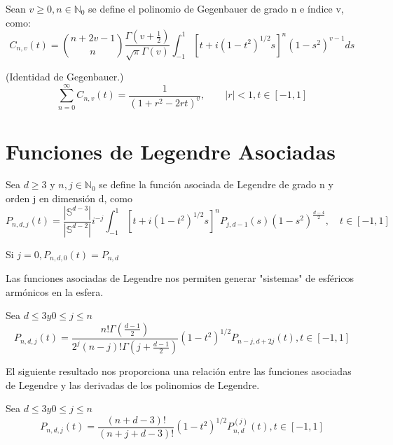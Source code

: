 \begin{defn}Sean $v\ge 0,n\in\mathds{N}_0$ se define el polinomio de Gegenbauer de grado n e índice v, como:
	$$C_{n,v}(t) = \binom{n+2v-1}{n}\frac{\Gamma(v+\frac{1}{2})}{\sqrt{\pi}\Gamma(v)}\int_{-1}^{1}\left[t+i(1-t^2)^{1/2}s\right]^n (1-s^2)^{v-1} ds$$ 
\end{defn}
\begin{prop}(Identidad de Gegenbauer.)$$
	\sum_{n=0}^{\infty} C_{n,v}(t) = \frac{1}{(1+r^2-2rt)^v}, \qquad |r|<1, t\in[-1,1]$$
\end{prop}
\chapter{Funciones de Legendre Asociadas}\label{aped.E}
\begin{defn}Sea $d\ge3$ y $n,j \in \mathds{N}_0$ se define la función asociada de Legendre de grado n y orden j en dimensión d, como
	$$
	P_{n,d,j}(t) = \frac{|\mathds{S}^{d-3}|}{|\mathds{S}^{d-2}|}i^{-j} \int_{-1}^{1}\left[t+i(1-t^2)^{1/2}s\right]^n P_{j,d-1}(s)(1-s^2)^{\frac{d-4}{2}}, \quad t\in[-1,1]
	$$
\end{defn}
\begin{rem}Si $j=0, P_{n,d,0}(t)=P_{n,d}$
\end{rem}
Las funciones asociadas de Legendre nos permiten generar "sistemas" de esféricos armónicos en la esfera.
\begin{prop}Sea $d\le3 y 0\le j \le n$ 
	$$	P_{n,d,j}(t) = \frac{n!\Gamma(\frac{d-1}{2})}{2^j(n-j)!\Gamma(j+\frac{d-1}{2})}(1-t^2)^{1/2} P_{n-j,d+2j}(t), t\in[-1,1]$$
\end{prop}
El siguiente resultado nos proporciona una relación entre las funciones asociadas de Legendre y las derivadas de los polinomios de Legendre.
\begin{prop}Sea $d\le3 y 0\le j \le n$ 
	$$	P_{n,d,j}(t) = \frac{(n+d-3)!}{(n+j+d-3)!}(1-t^2)^{1/2} P^{(j)}_{n,d}(t), t\in[-1,1]$$
\end{prop}
